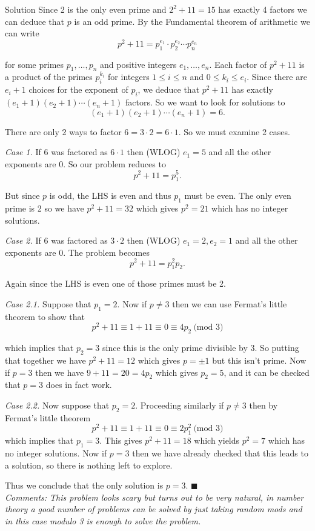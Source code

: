 \documentclass{article}
\begin{document}
\begin{solution}{Solution}
Since 2 is the only even prime and $2^2 + 11=15$ has exactly 4 factors
we can deduce that $p$ is an odd prime.
By the Fundamental theorem of arithmetic we can write
$$
p^2 + 11 = p_1^{e_1}\cdot p_2^{e_2} \cdots p_n^{e_n}
$$

for some primes $p_1, \ldots, p_n$ and positive integers $e_1, \ldots,
e_n$. Each factor of $p^2 + 11$ is a product of the primes
$p_i^{k_i}$ for integers $1\leq i \leq n$ and $0 \leq k_i \leq e_i$.
Since there are $e_i + 1$ choices for the exponent of $p_i$, we
deduce that $p^2 + 11$ has exactly
$(e_1 + 1)(e_2 + 1) \cdots (e_n + 1)$ factors. So we want to look for
solutions to
$$
(e_1 + 1)(e_2 + 1) \cdots (e_n + 1) = 6.
$$

There are only 2 ways to factor $6 = 3\cdot 2 = 6\cdot 1$. So we must
examine 2 cases.\vspace{0.2cm}

\textit{Case 1.}
If 6 was factored as $6\cdot 1$ then (WLOG) $e_1 = 5$ and all the other
exponents are 0. So our problem reduces to
$$
p^2 + 11 = p_1^5.
$$

But since $p$ is odd, the LHS is even and thus $p_1$ must be even. The only
even prime is 2 so we have $p^2 + 11 = 32$ which gives $p^2 = 21$ which
has no integer solutions. \vspace{0.2cm}

\textit{Case 2.}
If 6 was factored as $3\cdot 2$ then (WLOG) $e_1=2, e_2=1$ and all the
other exponents are 0. The problem becomes
$$
p^2 + 11 = p_1^{2}p_2.
$$

Again since the LHS is even one of those primes must be 2.\vspace{0.2cm}

\textit{Case 2.1.} Suppose that
$p_1 = 2$. Now if $p \neq 3$ then we can use Fermat's little theorem to
show that
$$
p^2 + 11 \equiv 1 + 11 \equiv 0 \equiv 4p_2 \ \text{(mod } 3)
$$

which implies that $p_2 = 3$ since this is the only prime divisible by 3.
So putting that together we have
$p^2 + 11 = 12$ which gives $p = \pm 1$ but this isn't prime.
Now if $p = 3$ then we have $9+11 = 20 = 4p_2$ which gives $p_2 = 5$, and
it can be checked that $p = 3$ does in fact work.\vspace{0.2cm}

\textit{Case 2.2.}
Now suppose that $p_2 = 2$. Proceeding similarly if $p\neq 3$ then
by Fermat's little theorem
$$
p^2 + 11 \equiv 1 + 11 \equiv 0 \equiv 2p_1^2 \ \text{(mod } 3)
$$
which implies that $p_1 = 3$. This gives $p^2 + 11 = 18$ which yields
$p^2 = 7$ which has no integer solutions. Now if $p=3$ then we have
already checked that this leads to a solution, so there is nothing left to
explore.\vspace{0.2cm}

Thus we conclude that the only solution is $p=3$. $\blacksquare$\\

\textit{Comments: This problem looks scary but turns out to be very natural,
in number theory a good number of problems can be solved by just taking
random mods and in this case modulo 3 is enough to solve the problem.}
\end{solution}
\end{document}
